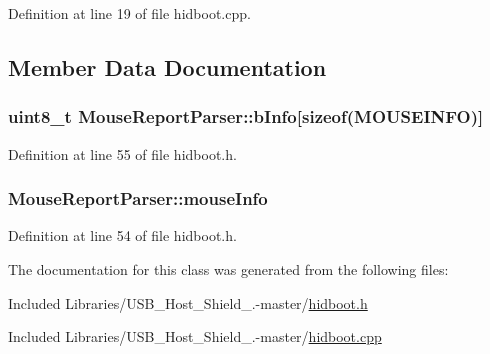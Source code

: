 \-Definition at line 19 of file hidboot.\-cpp.



\subsection{\-Member \-Data \-Documentation}
\hypertarget{class_mouse_report_parser_aa12ee1ccfc7bf834268ab6546c11998c}{
\subsubsection[{b\-Info}]{\setlength{\rightskip}{0pt plus 5cm}uint8\-\_\-t {\bf \-Mouse\-Report\-Parser\-::b\-Info}\mbox{[}sizeof({\bf \-M\-O\-U\-S\-E\-I\-N\-F\-O})\mbox{]}}}\label{class_mouse_report_parser_aa12ee1ccfc7bf834268ab6546c11998c}


\-Definition at line 55 of file hidboot.\-h.

\hypertarget{class_mouse_report_parser_a9daf20ab8deb57500426e40827b0a79c}{
\subsubsection[{mouse\-Info}]{ {\bf \-Mouse\-Report\-Parser\-::mouse\-Info}}}\label{class_mouse_report_parser_a9daf20ab8deb57500426e40827b0a79c}


\-Definition at line 54 of file hidboot.\-h.



\-The documentation for this class was generated from the following files\-:\begin{DoxyCompactItemize}
\item 
\-Included Libraries/\-U\-S\-B\-\_\-\-Host\-\_\-\-Shield\-\_.-\/master/\hyperlink{hidboot_8h}{hidboot.\-h}\item 
\-Included Libraries/\-U\-S\-B\-\_\-\-Host\-\_\-\-Shield\-\_.-\/master/\hyperlink{hidboot_8cpp}{hidboot.\-cpp}\end{DoxyCompactItemize}
